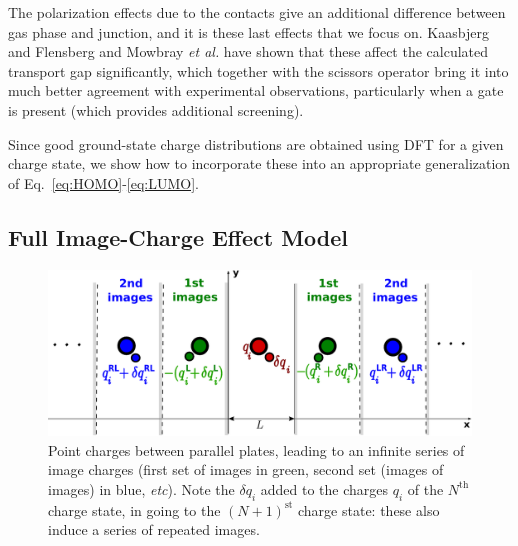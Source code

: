 \documentclass[aip,jcp,a4paper,reprint,floatfix,superscriptaddress]{revtex4-1}
\newcommand{\etal}{\emph{et al.}\xspace}
\begin{document}
The polarization effects due to the contacts give an additional difference between gas phase and junction, and it is these last effects that we focus on. Kaasbjerg and Flensberg\cite{Kaasbjerg2008} and Mowbray \etal\cite{Mowbray2008} have shown that these affect the calculated transport gap significantly, which together with the scissors operator bring it into much better agreement with experimental observations, particularly when a gate is present (which provides additional screening).\cite{Kaasbjerg2008}

Since good ground-state charge distributions are obtained using DFT for a given charge state, we show how to incorporate these into an appropriate generalization of Eq.~\eqref{eq:HOMO}-\eqref{eq:LUMO}.

\subsection{Full Image-Charge Effect Model}\label{full_model}

\begin{figure}
\includegraphics[width=\columnwidth]{img.exp/Illustration/mirrorplanes}
\caption{Point charges between parallel plates, leading to an infinite series of image charges (first set of images in green, second set (images of images) in blue, \emph{etc}). Note the $\delta q_i$ added to the charges $q_i$ of the $N^\text{th}$ charge state, in going to the $(N+1)^\text{st}$ charge state: these also induce a series of repeated images.}\label{fg:imagemodel}
\end{figure}
\end{document}
